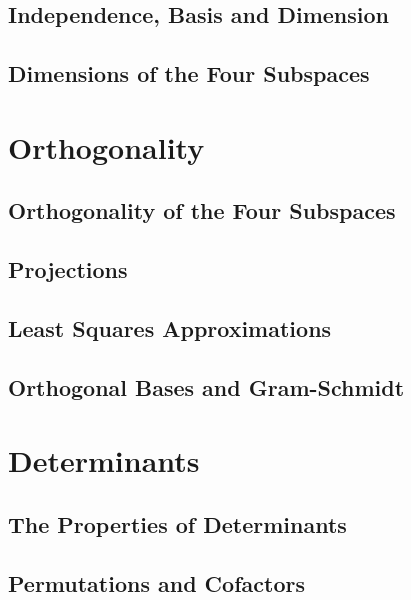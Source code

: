 \documentclass{book}
\begin{document}
\section{Independence, Basis and Dimension}

\section{Dimensions of the Four Subspaces}










\chapter{Orthogonality}
\section{Orthogonality of the Four Subspaces}

\section{Projections}

\section{Least Squares Approximations}

\section{Orthogonal Bases and Gram-Schmidt}







\chapter{Determinants}
\section{The Properties of Determinants}

\section{Permutations and Cofactors}
\end{document}
